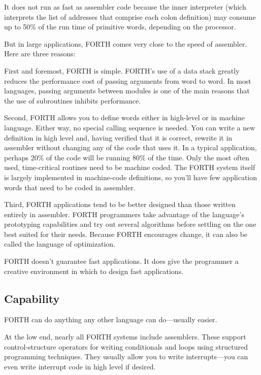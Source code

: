 It does not run as fast as assembler code because the inner interpreter
(which interprets the list of addresses that comprise each colon definition)
may consume up to 50\% of the run time of primitive words, depending
on the processor.

But in large applications, FORTH comes very close to the speed of
assembler. Here are three reasons:

First and foremost, FORTH is simple. FORTH's use of a data stack greatly
reduces the performance cost of passing arguments from word to word.
In most languages, passing arguments between modules is one of the
main reasons that the use of subroutines inhibits performance.

Second, FORTH allows you to define words either in high-level or in
machine language. Either way, no special calling sequence is needed.
You can write a new definition in high level and, having verified
that it is correct, rewrite it in assembler without changing any of
the code that uses it. In a typical application, perhaps 20\% of the
code will be running 80\% of the time. Only the most often used, time-critical
routines need to be machine coded. The FORTH system itself is largely
implemented in machine-code definitions, so you'll have few application
words that need to be coded in assembler.


Third, FORTH applications tend to be better designed than those written
entirely in assembler. FORTH programmers take advantage of the language's
prototyping capabilities and try out several algorithms before settling
on the one best suited for their needs. Because FORTH encourages change,
it can also be called the language of optimization.

FORTH doesn't guarantee fast applications. It does give the programmer
a creative environment in which to design fast applications.


\subsection{Capability}

FORTH can do anything any other language can do---usually easier.

At the low end, nearly all FORTH systems include assemblers. These
support control-structure operators for writing conditionals and loops
using structured programming techniques. They usually allow you to
write interrupts---you can even write interrupt code in high level
if desired.

